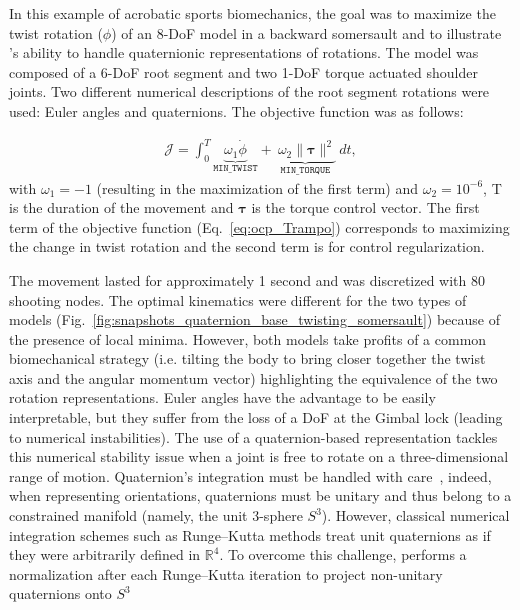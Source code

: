 In this example of acrobatic sports biomechanics, the goal was to maximize the twist rotation ($\phi$) of an 8-DoF model in a backward somersault and to illustrate \bioptim 's ability to handle quaternionic representations of rotations.
The model was composed of a 6-DoF root segment and two 1-DoF torque actuated shoulder joints.
Two different numerical descriptions of the root segment rotations were used: Euler angles and quaternions.
The objective function was as follows:

\begin{eqnarray}\label{eq:ocp_Trampo}
\mathcal{J} =  \int_0^T\underbrace{\omega_1 \dot{\phi}}_{\mathtt{MIN\_TWIST}}  + \underbrace{~\omega_2  \|\boldsymbol{\tau}\|^2}_{\mathtt{MIN\_ TORQUE}}~dt,
\end{eqnarray} 
with $\omega_1 = -1$ (resulting in the maximization of the first term) and $\omega_2 = 10^{-6}$, T is the duration of the movement and $\boldsymbol{\tau}$ is the torque control vector.
The first term of the objective function (Eq.~\ref{eq:ocp_Trampo}) corresponds to maximizing the change in twist rotation and the second term is for control regularization.

The movement lasted for approximately 1 second and was discretized with 80 shooting nodes.
The optimal kinematics were different for the two types of models (Fig.~\ref{fig:snapshots_quaternion_base_twisting_somersault}) because of the presence of local minima.
However, both models take profits of a common biomechanical strategy (i.e. tilting the body to bring closer together the twist axis and the angular momentum vector) highlighting the equivalence of the two rotation representations.
Euler angles have the advantage to be easily interpretable, but they suffer from the loss of a DoF at the Gimbal lock (leading to numerical instabilities).
The use of a quaternion-based representation tackles this numerical stability issue when a joint is free to rotate on a three-dimensional range of motion.
Quaternion's integration must be handled with care~\cite{bailly2020optimal}, indeed, when representing orientations, quaternions must be unitary and thus belong to a constrained manifold (namely, the unit 3-sphere $S^3$). 
However, classical numerical integration schemes such as Runge–Kutta methods treat unit quaternions as if they were arbitrarily defined in $\mathbb{R}^4$.
To overcome this challenge, \bioptim performs a normalization after each Runge–Kutta iteration to project non-unitary quaternions onto $S^3$

